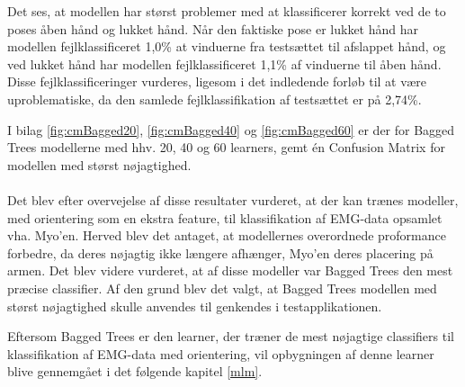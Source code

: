 Det ses, at modellen har størst problemer med at klassificerer korrekt ved de to poses åben hånd og lukket hånd. Når den faktiske pose er lukket hånd har modellen fejlklassificeret 1,0\% at vinduerne fra testsættet til afslappet hånd, og ved lukket hånd har modellen fejlklassificeret 1,1\% af vinduerne til åben hånd. 
Disse fejlklassificeringer vurderes, ligesom i det indledende forløb til at være uproblematiske, da den samlede fejlklassifikation af testsættet er på 2,74\%. 

I bilag \ref{fig:cmBagged20}, \ref{fig:cmBagged40} og \ref{fig:cmBagged60} er der for Bagged Trees modellerne med hhv. 20, 40 og 60 learners, gemt én Confusion Matrix for modellen med størst nøjagtighed.\\\\
Det blev efter overvejelse af disse resultater vurderet, at der kan trænes modeller, med orientering som en ekstra feature, til klassifikation af EMG-data opsamlet vha. Myo'en. Herved blev det antaget, at modellernes overordnede proformance forbedre, da deres nøjagtig ikke længere afhænger, Myo'en deres placering på armen. Det blev videre vurderet, at af disse modeller var Bagged Trees den mest præcise classifier. Af den grund blev det valgt, at Bagged Trees modellen med størst nøjagtighed skulle anvendes til genkendes i testapplikationen. 

Eftersom Bagged Trees er den learner, der træner de mest nøjagtige classifiers til klassifikation af EMG-data med orientering, vil opbygningen af denne learner blive gennemgået i det følgende kapitel \ref{mlm}.
 